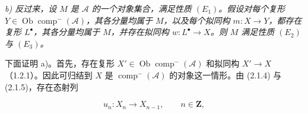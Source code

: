 \noindent\textit{b) 反过来，设 $M$ 是 $\mathcal A$ 的一个对象集合，满足性质
$(E_1)$。假设对每个复形
$Y\in\operatorname{Ob}\operatorname{comp}^{-}(\mathcal A)$，其各分量均属于 $M$，以及每个拟同构
$m\colon X\longrightarrow Y$，都存在复形 $L^\bullet$，其各分量均属于 $M$，并存在拟同构
$w\colon L^\bullet\longrightarrow X$。则 $M$ 满足性质 $(E_2)$ 与 $(E_3)$。}

下面证明 a)。首先，存在复形
$X'\in\operatorname{Ob}\operatorname{comp}^{-}(\mathcal A)$ 和拟同构
$X'\longrightarrow X$（1.2.1）。因此可归结到 $X$ 是
$\operatorname{comp}^{-}(\mathcal A)$ 的对象这一情形。由 (2.1.4) 与 (2.1.5)，存在态射列

\[
u_n\colon X_n\longrightarrow X_{n-1},
\qquad n\in\mathbf Z,
\]
\endgroup
